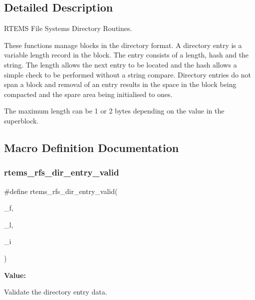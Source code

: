 \subsection{Detailed Description}
R\+T\+E\+MS File Systems Directory Routines. 

These functions manage blocks in the directory format. A directory entry is a variable length record in the block. The entry consists of a length, hash and the string. The length allows the next entry to be located and the hash allows a simple check to be performed without a string compare. Directory entries do not span a block and removal of an entry results in the space in the block being compacted and the spare area being initialised to ones.

The maximum length can be 1 or 2 bytes depending on the value in the superblock. 

\subsection{Macro Definition Documentation}
\mbox{\label{rtems-rfs-dir_8c_a7c9a4896613364950a98984676e74fd8}} 
\subsubsection{\texorpdfstring{rtems\_rfs\_dir\_entry\_valid}{rtems\_rfs\_dir\_entry\_valid}}
{\footnotesize\ttfamily \#define rtems\+\_\+rfs\+\_\+dir\+\_\+entry\+\_\+valid(\begin{DoxyParamCaption}\item[{}]{\+\_\+f,  }\item[{}]{\+\_\+l,  }\item[{}]{\+\_\+i }\end{DoxyParamCaption})}

{\bfseries Value\+:}
\begin{DoxyCode}{0}

\end{DoxyCode}
Validate the directory entry data. 

